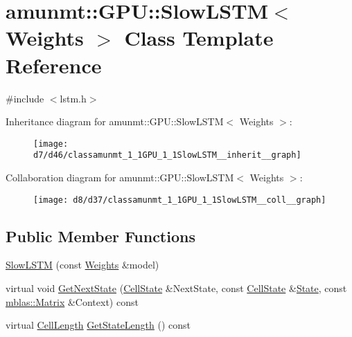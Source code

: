 \hypertarget{classamunmt_1_1GPU_1_1SlowLSTM}{}\section{amunmt\+:\+:G\+PU\+:\+:Slow\+L\+S\+TM$<$ Weights $>$ Class Template Reference}
\label{classamunmt_1_1GPU_1_1SlowLSTM}


{\ttfamily \#include $<$lstm.\+h$>$}



Inheritance diagram for amunmt\+:\+:G\+PU\+:\+:Slow\+L\+S\+TM$<$ Weights $>$\+:
\nopagebreak
\begin{figure}[H]
\begin{center}
\leavevmode
\texttt{[image: d7/d46/classamunmt\_1\_1GPU\_1\_1SlowLSTM\_\_inherit\_\_graph]}
\end{center}
\end{figure}


Collaboration diagram for amunmt\+:\+:G\+PU\+:\+:Slow\+L\+S\+TM$<$ Weights $>$\+:
\nopagebreak
\begin{figure}[H]
\begin{center}
\leavevmode
\texttt{[image: d8/d37/classamunmt\_1\_1GPU\_1\_1SlowLSTM\_\_coll\_\_graph]}
\end{center}
\end{figure}
\subsection*{Public Member Functions}
\begin{DoxyCompactItemize}
\item 
\hyperlink{classamunmt_1_1GPU_1_1SlowLSTM_a63203f4c1e9fbc4d85945aca374db8c9}{Slow\+L\+S\+TM} (const \hyperlink{structamunmt_1_1GPU_1_1Weights}{Weights} \&model)
\item 
virtual void \hyperlink{classamunmt_1_1GPU_1_1SlowLSTM_a445547f2b64a36f61c0a62dc682364f3}{Get\+Next\+State} (\hyperlink{structamunmt_1_1GPU_1_1CellState}{Cell\+State} \&Next\+State, const \hyperlink{structamunmt_1_1GPU_1_1CellState}{Cell\+State} \&\hyperlink{classamunmt_1_1State}{State}, const \hyperlink{namespaceamunmt_1_1GPU_1_1mblas_ab67821a8254de53e45a623cf73c0aef6}{mblas\+::\+Matrix} \&Context) const 
\item 
virtual \hyperlink{structamunmt_1_1GPU_1_1CellLength}{Cell\+Length} \hyperlink{classamunmt_1_1GPU_1_1SlowLSTM_aec4f004b4e6525758546bf164a5de90b}{Get\+State\+Length} () const 
\end{DoxyCompactItemize}
